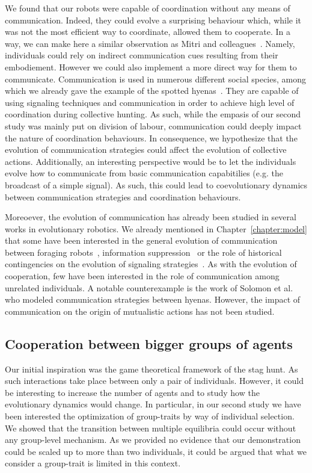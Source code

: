			We found that our robots were capable of coordination without any means of communication. Indeed, they could evolve a surprising behaviour which, while it was not the most efficient way to coordinate, allowed them to cooperate. In a way, we can make here a similar observation as Mitri and colleagues~\parencite{Mitri2009}. Namely, individuals could rely on indirect communication cues resulting from their embodiement. However we could also implement a more direct way for them to communicate. Communication is used in numerous different social species, among which we already gave the example of the spotted hyenas~\parencite{Drea2009a, Smith2010, Smith2012a}. They are capable of using signaling techniques and communication in order to achieve high level of coordination during collective hunting. As such, while the empasis of our second study was mainly put on division of labour, communication could deeply impact the nature of coordination behaviours. In consequence, we hypothesize that the evolution of communication strategies could affect the evolution of collective actions. Additionally, an interesting perspective would be to let the individuals evolve how to communicate from basic communication capabitilies (e.g. the broadcast of a simple signal). As such, this could lead to coevolutionary dynamics between communication strategies and coordination behaviours.

			Moreoever, the evolution of communication has already been studied in several works in evolutionary robotics. We already mentioned in Chapter~\ref{chapter:model} that some have been interested in the general evolution of communication between foraging robots~\parencite{Floreano2007}, information suppression~\parencite{Mitri2009} or the role of historical contingencies on the evolution of signaling strategies~\parencite{Wischmann2012}. As with the evolution of cooperation, few have been interested in the role of communication among unrelated individuals. A notable counterexample is the work of Solomon et al.~\parencite{Solomon2012} who modeled communication strategies between hyenas. However, the impact of communication on the origin of mutualistic actions has not been studied.


		\subsection{Cooperation between bigger groups of agents}

			Our initial inspiration was the game theoretical framework of the stag hunt. As such interactions take place between only a pair of individuals. However, it could be interesting to increase the number of agents and to study how the evolutionary dynamics would change. In particular, in our second study we have been interested the optimization of group-traits by way of individual selection. We showed that the transition between multiple equilibria could occur without any group-level mechanism. As we provided no evidence that our demonstration could be scaled up to more than two individuals, it could be argued that what we consider a group-trait is limited in this context. 

